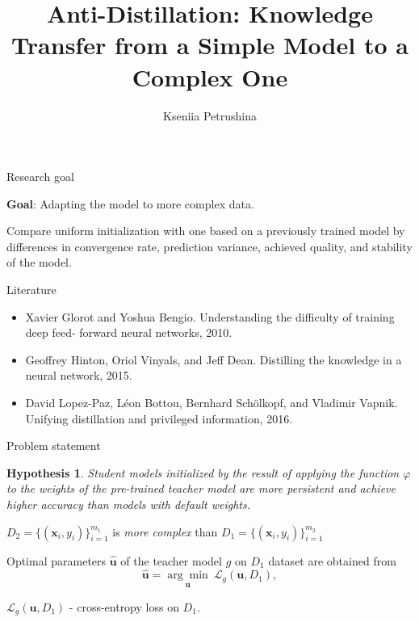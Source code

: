 \documentclass[dvipsnames]{beamer}
\title[\hbox to 56mm{Theme}]{Anti-Distillation: Knowledge Transfer from a Simple Model to a Complex One}
\author[K.~Petrushina]{Kseniia Petrushina}
\institute{Moscow~Institute~of~Physics~and~Technology}
\date{\footnotesize
\par\smallskip\emph{Expert:} Vadim~Strijov
\par\smallskip\emph{Consultant:} Andrey Grabovoy
\par\bigskip\small 2022}
\begin{document}
\begin{frame}
\thispagestyle{empty}
\maketitle
\end{frame}

\begin{frame}{Research goal}

    \textbf{Goal}: Adapting the model to more complex data.
    
    \bigskip
    
    Compare uniform initialization with one based on a previously trained model by differences in convergence rate, prediction variance, achieved quality, and stability of the model.

\end{frame}


\begin{frame}{Literature}
    \begin{itemize}
        \item Xavier Glorot and Yoshua Bengio. Understanding the difficulty of training deep feed- forward neural networks, 2010.
        \item Geoffrey Hinton, Oriol Vinyals, and Jeff Dean. Distilling the knowledge in a neural network, 2015.
        \item David Lopez-Paz, Léon Bottou, Bernhard Schölkopf, and Vladimir Vapnik. Unifying distillation and privileged information, 2016.
    \end{itemize}
\end{frame}


\begin{frame}{Problem statement}
    \newtheorem{hypothesis}{Hypothesis}
    \begin{hypothesis}
    Student models initialized by the result of applying the function $\varphi$ to the weights of the pre-trained teacher model are more persistent and achieve higher accuracy than models with default weights.
    \end{hypothesis}
    
    \bigskip
    
    $D_2 = \{(\textbf{x}_i, y_i)\}_{i=1}^{m_1}$ is \textit{more complex} than $D_1 = \{(\textbf{x}_i, y_i)\}_{i=1}^{m_2}$
    
    \bigskip
    
    Optimal parameters $\hat{\textbf{u}}$ of the teacher model $g$ on $D_1$ dataset are obtained from 
    $$\hat{\mathbf{u}} =  \underset{\mathbf{u}}{\arg\min}~\mathcal{L}_g(\mathbf{u}, D_1),$$
    
    $\mathcal{L}_g(\mathbf{u}, D_1)$ - cross-entropy loss on $D_1$.

\end{frame}
\end{document}
